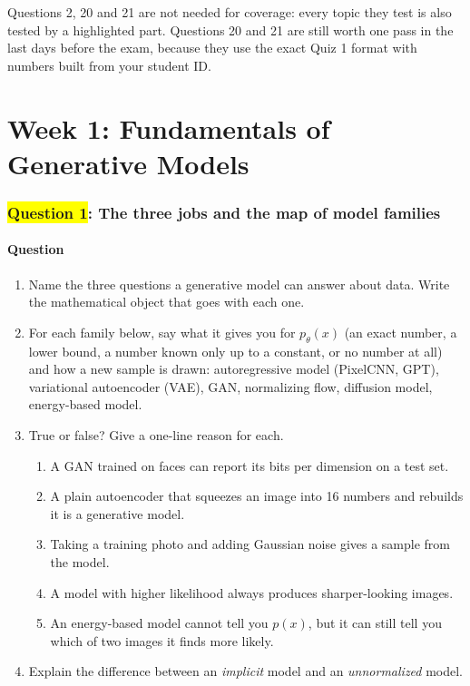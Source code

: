 \documentclass[12pt,a4paper]{article}
\begin{document}
Questions 2, 20 and 21 are not needed for coverage: every topic they test is also tested by a highlighted part. Questions 20 and 21 are still worth one pass in the last days before the exam, because they use the exact Quiz 1 format with numbers built from your student ID.

\newpage
\part{Week 1: Fundamentals of Generative Models}

\section{\texorpdfstring{\colorbox{yellow}{Question 1}}{Question 1}: The three jobs and the map of model families}

\subsection{Question}

\begin{enumerate}[label=(\alph*)]
  \item[\colorbox{yellow}{(a)}] Name the three questions a generative model can answer about data. Write the mathematical object that goes with each one.
  \item[\colorbox{yellow}{(b)}] For each family below, say what it gives you for $p_\theta(x)$ (an exact number, a lower bound, a number known only up to a constant, or no number at all) and how a new sample is drawn: autoregressive model (PixelCNN, GPT), variational autoencoder (VAE), GAN, normalizing flow, diffusion model, energy-based model.
  \item[\colorbox{yellow}{(c)}] True or false? Give a one-line reason for each.
  \begin{enumerate}[label=(\roman*)]
    \item A GAN trained on faces can report its bits per dimension on a test set.
    \item A plain autoencoder that squeezes an image into 16 numbers and rebuilds it is a generative model.
    \item Taking a training photo and adding Gaussian noise gives a sample from the model.
    \item A model with higher likelihood always produces sharper-looking images.
    \item An energy-based model cannot tell you $p(x)$, but it can still tell you which of two images it finds more likely.
  \end{enumerate}
  \item Explain the difference between an \emph{implicit} model and an \emph{unnormalized} model.
\end{enumerate}
\end{document}
